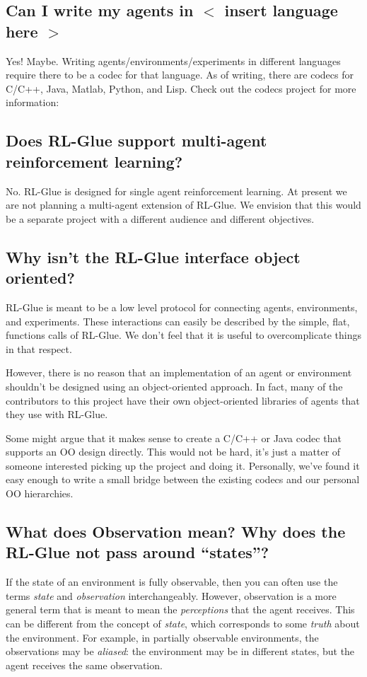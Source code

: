 \documentclass[11pt]{article}
\begin{document}
\subsection{Can I write my agents in $<$ insert language here $>$}
Yes! Maybe.  Writing agents/environments/experiments in different languages require there to be a codec for that language.  As of writing, there are codecs for C/C++, Java, Matlab, Python, and Lisp.  Check out the codecs project for more information:\newline
{}

\subsection{Does RL-Glue support multi-agent reinforcement learning?}
 No. RL-Glue is designed for single agent reinforcement learning. At present we are not planning a multi-agent extension of RL-Glue. We envision that this would be a separate project with a different audience and different objectives.  
 
\subsection{Why isn't the RL-Glue interface object oriented?}
RL-Glue is meant to be a low level protocol for connecting agents, environments, and experiments.  These interactions can
easily be described by the simple, flat, functions calls of RL-Glue.  We don't feel that it is useful to overcomplicate
things in that respect.

However, there is no reason that an implementation of an agent or environment shouldn't be designed using an object-oriented 
approach.  In fact, many of the contributors to this project have their own object-oriented libraries of agents that 
they use with RL-Glue.

Some might argue that it makes sense to create a C/C++ or Java codec that supports an OO design
directly.  This would not be hard, it's just a matter of someone interested picking up the project and doing it.  Personally, 
we've found it easy enough to write a small bridge between the existing codecs and our personal OO hierarchies.

\subsection{What does Observation mean? Why does the RL-Glue not pass around ``states''?}
If the state of an environment is fully observable, then you can often use the terms \textit{state} and \textit{observation} interchangeably. However, 
observation is a more  general term that is meant to mean the \textit{perceptions} that the agent receives.  This can be different 
from the concept of \textit{state}, which corresponds to some \textit{truth} about the environment.  For example, in partially observable environments, the observations
may be \textit{aliased}: the environment may be in different states, but the agent receives the same observation. 
\end{document}
